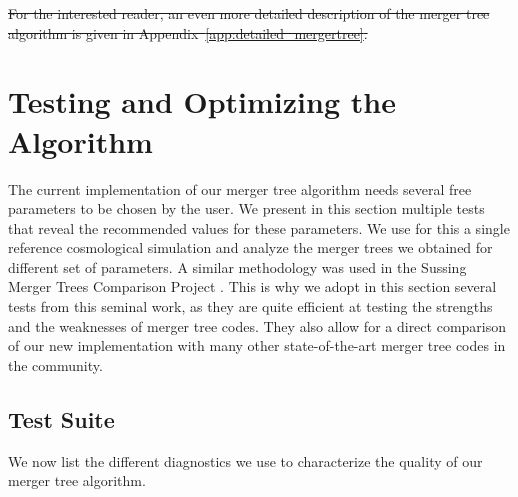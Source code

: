 \documentclass[a4paper,twocolumn,fleqn,usenatbib]{mnras}
\providecommand{\DIFdel}[1]{{\protect\color{red}\sout{#1}}}                      %
\providecommand{\DIFdelend}{} %
\DeclareRobustCommand{\DIFdelend}{\DIFOaddend \let\includegraphics\DIFOincludegraphics} %
\begin{document}
\DIFdel{For the interested reader, an even more detailed description of the merger tree
algorithm is given in Appendix~\ref{app:detailed_mergertree}.
}%

\DIFdelend %
\section{Testing and Optimizing the Algorithm}\label{chap:tests}

The current implementation of our merger tree algorithm needs several
free parameters to be chosen by the user. We present in this section
multiple tests that reveal the recommended values for these
parameters.  We use for this a single reference cosmological
simulation and analyze the merger trees we obtained for different set
of parameters.  A similar methodology was used in the Sussing Merger
Trees Comparison Project \citep{SUSSING_COMPARISON,
  SUSSING_CONVERGENCE, SUSSING_HALOFINDER,leeSussingMergerTrees2014a}.
This is why we adopt in this section several tests from this seminal
work, as they are quite efficient at testing the strengths and the
weaknesses of merger tree codes. They also allow for a direct
comparison of our new implementation with many other state-of-the-art
merger tree codes in the community.

\subsection{Test Suite}\label{chap:testing_methods}

We now list the different diagnostics we use to characterize the quality of
our merger tree algorithm.
\end{document}
